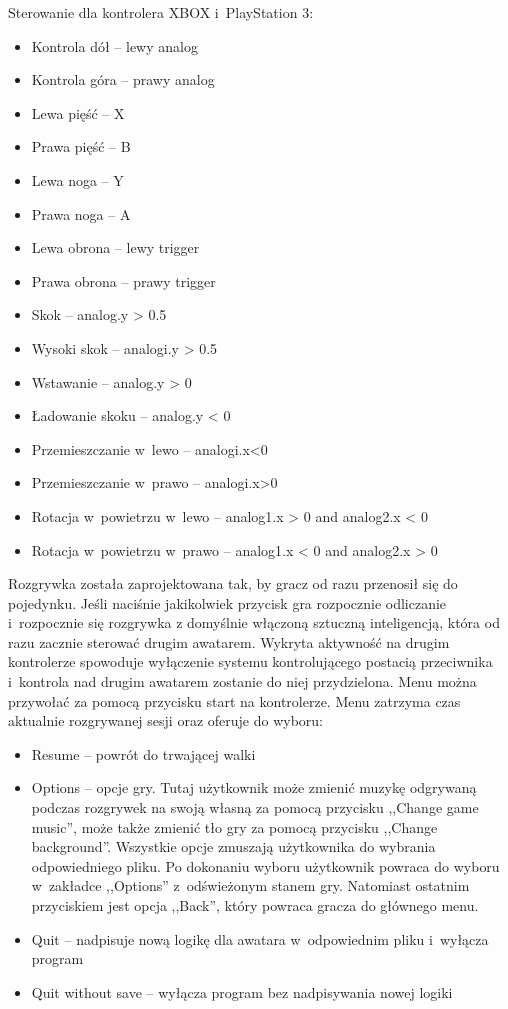 \documentclass[brudnopis]{xmgr}
\begin{document}
Sterowanie dla kontrolera XBOX i~PlayStation 3:
\begin{itemize}
\item Kontrola dół -- lewy analog
\item Kontrola góra -- prawy analog
\item Lewa pięść -- X
\item Prawa pięść -- B
\item Lewa noga -- Y
\item Prawa noga -- A
\item Lewa obrona -- lewy trigger
\item Prawa obrona -- prawy trigger
\item Skok -- analog.y > 0.5
\item Wysoki skok -- analogi.y > 0.5
\item Wstawanie -- analog.y > 0
\item Ładowanie skoku -- analog.y < 0
\item Przemieszczanie w~lewo -- analogi.x<0
\item Przemieszczanie w~prawo -- analogi.x>0
\item Rotacja w~powietrzu w~lewo -- analog1.x > 0 and analog2.x < 0
\item Rotacja w~powietrzu w~prawo -- analog1.x < 0 and analog2.x > 0
\end{itemize}
Rozgrywka została zaprojektowana tak, by gracz od razu przenosił się do
pojedynku. Jeśli naciśnie
jakikolwiek przycisk gra rozpocznie odliczanie i~rozpocznie się rozgrywka z
domyślnie włączoną sztuczną inteligencją, która od razu zacznie sterować
drugim awatarem. Wykryta aktywność na drugim
kontrolerze spowoduje wyłączenie systemu kontrolującego postacią przeciwnika i~kontrola nad drugim awatarem
zostanie do niej przydzielona.
Menu można przywołać za pomocą przycisku start na kontrolerze. Menu
zatrzyma czas aktualnie rozgrywanej sesji oraz oferuje do wyboru:
\begin{itemize}
\item Resume -- powrót do trwającej walki
\item Options -- opcje gry. Tutaj użytkownik może zmienić muzykę odgrywaną podczas rozgrywek na
swoją własną za pomocą przycisku ,,Change game music'', może także zmienić
tło gry za pomocą przycisku ,,Change background''. Wszystkie opcje zmuszają użytkownika do
wybrania odpowiedniego pliku. Po dokonaniu wyboru użytkownik powraca do
wyboru w~zakładce ,,Options'' z~odświeżonym stanem gry. Natomiast ostatnim
przyciskiem jest opcja ,,Back'', który powraca gracza do głównego menu.
\item Quit -- nadpisuje nową logikę dla awatara w~odpowiednim pliku i~wyłącza
program
\item Quit without save -- wyłącza program bez nadpisywania nowej logiki

\end{itemize}
\end{document}
